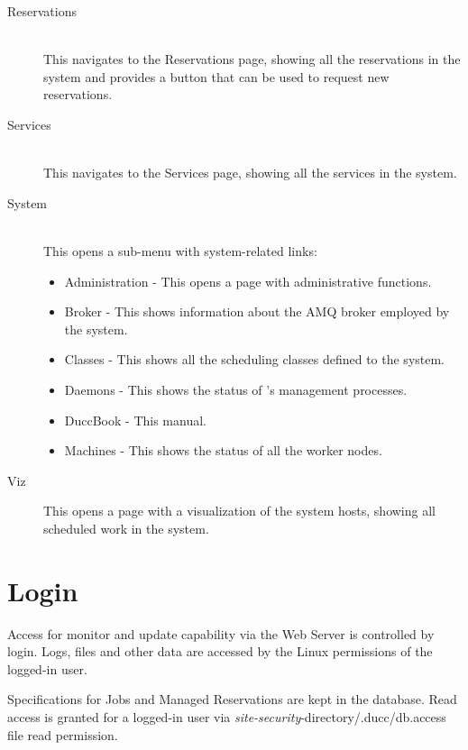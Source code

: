 \begin{description}
          \item[Reservations] \hfill \\
            This navigates to the Reservations page, showing all the reservations
            in the system and provides a button that can be used to request new reservations. 

          \item[Services] \hfill \\
            This navigates to the Services page, showing all the services in the
            system.

          \item[System] \hfill \\
            This opens a sub-menu with system-related links:
            \begin{itemize}
              \item Administration - This opens a page with administrative functions. 
              \item Broker - This shows information about the AMQ broker employed by the system. 
              \item Classes - This shows all the scheduling classes defined to the system. 
              \item Daemons - This shows the status of {\DUCC}'s management processes. 
              \item DuccBook - This manual. 
              \item Machines - This shows the status of all the {\DUCC} worker nodes. 
            \end{itemize}

            \item[Viz]
            This opens a page with a visualization of the system hosts, showing all
            scheduled work in the system.
      \end{description}              


	\section{Login}
	
	Access for monitor and update capability via the Web Server is controlled by login.  
	Logs, files and other data are accessed by the Linux permissions of the 
	logged-in user.
	
	Specifications for Jobs and Managed Reservations are kept in the database.  
	Read access is granted for a logged-in user
	via {\em site-security}-directory/.ducc/db.access file read permission.
	
